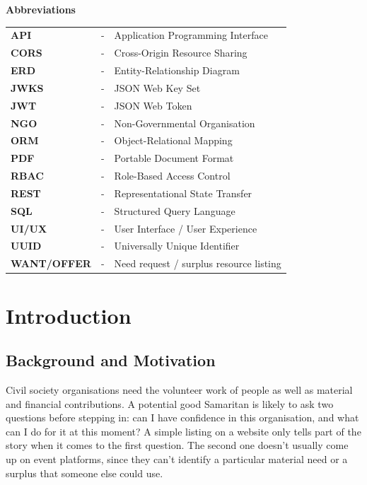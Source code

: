 \cleardoublepage
{}
\thispagestyle{empty}
\begin{center}{\Huge\textbf{Abbreviations}}\end{center}
\vspace{0.3in}
\begin{longtable}{p{}cp{}}
\textbf{API} & - & Application Programming Interface\\
\textbf{CORS} & - & Cross-Origin Resource Sharing\\
\textbf{ERD} & - & Entity-Relationship Diagram\\
\textbf{JWKS} & - & JSON Web Key Set\\
\textbf{JWT} & - & JSON Web Token\\
\textbf{NGO} & - & Non-Governmental Organisation\\
\textbf{ORM} & - & Object-Relational Mapping\\
\textbf{PDF} & - & Portable Document Format\\
\textbf{RBAC} & - & Role-Based Access Control\\
\textbf{REST} & - & Representational State Transfer\\
\textbf{SQL} & - & Structured Query Language\\
\textbf{UI/UX} & - & User Interface / User Experience\\
\textbf{UUID} & - & Universally Unique Identifier\\
\textbf{WANT/OFFER} & - & Need request / surplus resource listing\\
\end{longtable}

\cleardoublepage
{}

\chapter{Introduction}
\label{ch:introduction}

\section{Background and Motivation}
Civil society organisations need the volunteer work of people as well as material and financial contributions. A potential good Samaritan is likely to ask two questions before stepping in: can I have confidence in this organisation, and what can I do for it at this moment? A simple listing on a website only tells part of the story when it comes to the first question. The second one doesn't usually come up on event platforms, since they can't identify a particular material need or a surplus that someone else could use.

